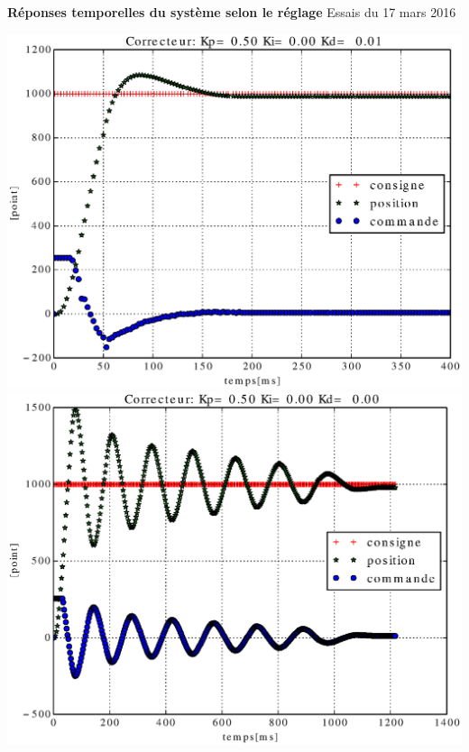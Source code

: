 \documentclass[12pt,a4paper]{article}
\begin{document}
\begin{center}
\textbf{Réponses temporelles du système selon le réglage}
Essais du 17 mars 2016
\end{center}

\includegraphics[scale=0.4]{images/figure_essai_5.eps} 
\includegraphics[scale=0.4]{images/figure_essai_6.eps}
\end{document}

